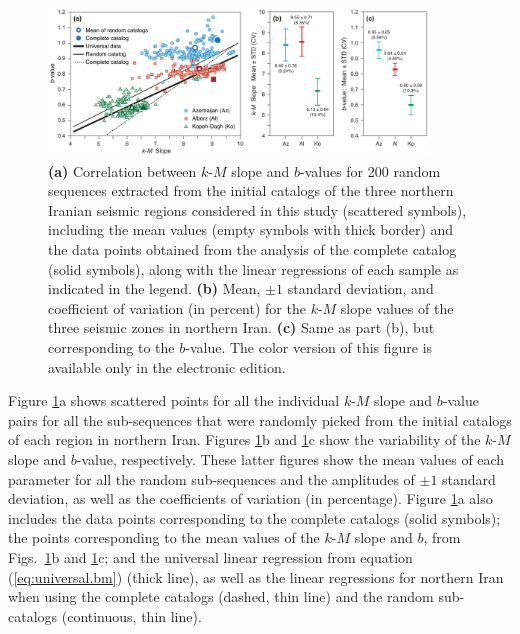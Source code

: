 \begin{figure}%
	\centering
	\includegraphics[width=0.9\textwidth]{figures/pdf/figure-08} 
	\caption{\textbf{(a)} Correlation between $k$-$M$ slope and $b$-values for 200 random sequences extracted from the initial catalogs of the three northern Iranian seismic regions considered in this study (scattered symbols), including the mean values (empty symbols with thick border) and the data points obtained from the analysis of the complete catalog (solid symbols), along with the linear regressions of each sample as indicated in the legend. \textbf{(b)} Mean, $\pm1$ standard deviation, and coefficient of variation (in percent) for the $k$-$M$ slope values of the three seismic zones in northern Iran. \textbf{(c)} Same as part (b), but corresponding to the $b$-value. The color version of this figure is available only in the electronic edition.}
	\label{fig:random}
\end{figure}

Figure \ref{fig:random}a shows scattered points for all the individual $k$-$M$ slope and $b$-value pairs for all the sub-sequences that were randomly picked from the initial catalogs of each region in northern Iran. Figures \ref{fig:random}b and \ref{fig:random}c show the variability of the $k$-$M$ slope and $b$-value, respectively. These latter figures show the mean values of each parameter for all the random sub-sequences and the amplitudes of $\pm 1$ standard deviation, as well as the coefficients of variation (in percentage). Figure \ref{fig:random}a also includes the data points corresponding to the complete catalogs (solid symbols); the points corresponding to the mean values of the $k$-$M$ slope and $b$, from Figs.~\ref{fig:random}b and \ref{fig:random}c; and the universal linear regression from equation (\ref{eq:universal.bm}) (thick line), as well as the linear regressions for northern Iran when using the complete catalogs (dashed, thin line) and the random sub-catalogs (continuous, thin line). 

